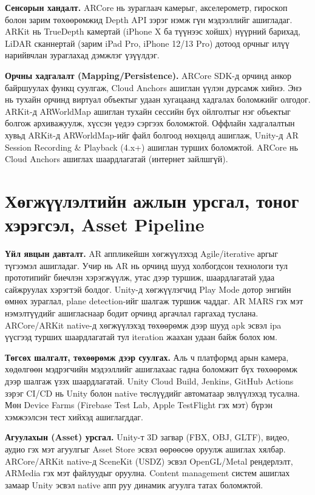 \begin{sloppy}
\textbf{Сенсорын хандалт.} ARCore нь зураглаач камерыг, акселерометр, гироскоп болон зарим төхөөрөмжид Depth API зэрэг нэмж гүн мэдээллийг ашигладаг. ARKit нь TrueDepth камертай (iPhone X ба түүнээс хойшх) нүүрний барихад, LiDAR сканнертай (зарим iPad Pro, iPhone 12/13 Pro) дотоод орчныг илүү нарийвчлан зураглахад дэмжлэг үзүүлдэг.

\textbf{Орчны хадгалалт (Mapping/Persistence).} ARCore SDK-д орчинд анкор байршуулах функц суулгаж, Cloud Anchors ашиглан үүлэн дурсамж хийнэ. Энэ нь тухайн орчинд виртуал объектыг удаан хугацаанд хадгалах боломжийг олгодог. ARKit-д ARWorldMap ашиглан тухайн сессийн бүх ойлголтыг нэг объектыг болгож архиважуулж, хүссэн үедээ сэргээх боломжтой. Оффлайн хадгалалтын хувьд ARKit-д ARWorldMap-ийг файл болгоод нөхцөлд ашиглаж, Unity-д AR Session Recording \& Playback (4.x+) ашиглан турших боломжтой. ARCore нь Cloud Anchors ашиглах шаардлагатай (интернет зайлшгүй).

\section*{Хөгжүүлэлтийн ажлын урсгал, тоног хэрэгсэл, Asset Pipeline}

\textbf{Үйл явцын давталт.} AR аппликейшн хөгжүүлэхэд Agile/iterative аргыг түгээмэл ашигладаг. Учир нь AR нь орчинд шууд холбогдсон технологи тул прототипийг биечлэн хэрэгжүүлж, утас дээр туршиж, шаардлагатай удаа сайжруулах хэрэгтэй болдог. Unity-д хөгжүүлэгчид Play Mode дотор энгийн өмнөх зураглал, plane detection-ийг шалгаж туршиж чаддаг. AR MARS гэх мэт нэмэлтүүдийг ашигласнаар бодит орчинд аргачлал гаргахад туслана. ARCore/ARKit native-д хөгжүүлэхэд төхөөрөмж дээр шууд apk эсвэл ipa үүсгээд турших шаардлагатай тул iteration жаахан удаан байж болох юм.

\textbf{Төгсөх шалгалт, төхөөрөмж дээр суулгах.} Аль ч платформд арын камера, хөдөлгөөн мэдрэгчийн мэдээллийг ашиглахаас гадна боломжит бүх төхөөрөмж дээр шалгаж үзэх шаардлагатай. Unity Cloud Build, Jenkins, GitHub Actions зэрэг CI/CD нь Unity болон native төслүүдийг автоматаар эвлүүлэхэд тусална. Мөн Device Farms (Firebase Test Lab, Apple TestFlight гэх мэт) бүрэн хэмжээлсэн тест хийхэд ашиглагддаг.

\textbf{Агуулахын (Asset) урсгал.} Unity-т 3D загвар (FBX, OBJ, GLTF), видео, аудио гэх мэт агуулгыг Asset Store эсвэл өөрөөсөө оруулж ашиглах хялбар. ARCore/ARKit native-д SceneKit (USDZ) эсвэл OpenGL/Metal рендерлэлт, ARMedia гэх мэт файлуудыг оруулна. Content management систем ашиглах замаар Unity эсвэл native апп руу динамик агуулга татах боломжтой.


\end{sloppy}
